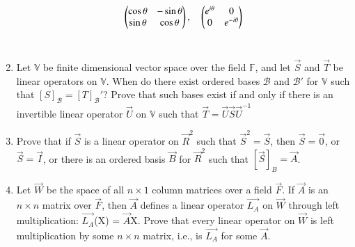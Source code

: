 \begin{enumerate}[label=\thesubsection.\arabic*.,ref=\thesubsection.\theenumi]
\begin{align}
    \begin{pmatrix}\cos{\theta} & -\sin{\theta} \\ \sin{\theta} & \cos{\theta}\end{pmatrix},
    \quad
    \begin{pmatrix}e^{i\theta} & 0 \\ 0 & e^{-i\theta}\end{pmatrix} \nonumber
\end{align}
%
\\
\solution

\item Let $\mathbb V$ be finite dimensional vector space over the field $\mathbb F$, and let $\vec{S}$ and $\vec{T}$ be linear operators on $\mathbb V$. When do there exist ordered bases $\mathcal{B}$ and $\mathcal{B}'$ for $\mathbb V$ such that $[S]_\mathcal{B} = [T]_\mathcal{B}'$? Prove that such bases exist if and only if there is an invertible linear operator $\vec{U}$ on $\mathbb V$ such that $\vec{T} = \vec{U}\vec{S}\vec{U}^{-1}$
%
\\
\solution

\item Prove that if $\vec{S}$ is a linear operator on $\vec{R}^2$ such that $\vec{S}^2=\vec{S}$, 
then $\vec{S}=\vec{0}$, or $\vec{S}=\vec{I}$, or there is an ordered basis $\vec{B}$ for $\vec{R}^2$ 
such that $[\vec{S}]_B=\vec{A}$.
%
\\
\solution

%
\item Let $\vec{W}$ be the space of all $n \times 1$ column matrices over a field $\vec{F}$. If $\vec{A}$ is an $n \times n$ matrix over $\vec{F}$, then $\vec{A}$ defines a linear operator $\vec{L_{A}}$ on $\vec{W}$ through left multiplication: $\vec{L_{A}}$(X) = $\vec{A}$X. Prove that every linear operator on $\vec{W}$ is left multiplication by some $n\times n$ matrix, i.e., is $\vec{L_{A}}$ for some $\vec{A}$.


\end{enumerate}
